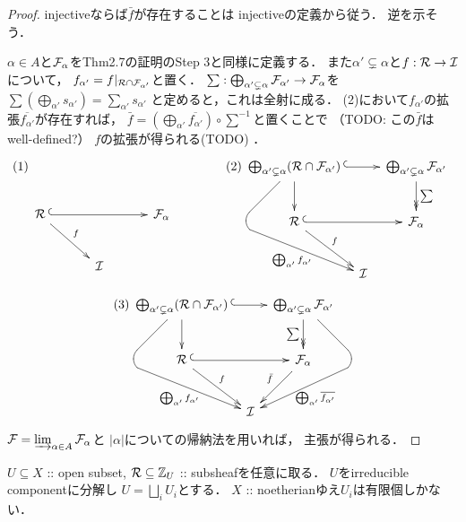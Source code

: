 \documentclass[a4paper]{jsarticle}
\begin{document}
    \begin{proof}
        injectiveならば$\bar{f}$が存在することは
        injectiveの定義から従う．
        逆を示そう．

        $\alpha \in A$と$\mathcal{F}_{\alpha}$をThm2.7の証明のStep 3と同様に定義する．
        また$\alpha' \subsetneq \alpha$と$f: \mathcal{R} \to \mathcal{I}$について，
        $f_{\alpha'}=f|_{\mathcal{R} \cap \mathcal{F}_{\alpha'}}$と置く．
        $\sum:  \bigoplus_{\alpha' \subsetneq \alpha} \mathcal{F}_{\alpha'} \to \mathcal{F}_{\alpha}$を
        $\sum \left(\bigoplus_{\alpha'} s_{\alpha'}\right)=\sum_{\alpha'} s_{\alpha'}$
        と定めると，これは全射に成る．
        (2)において$f_{\alpha'}$の拡張$\overline{f_{\alpha'}}$が存在すれば，
        $\bar{f}=(\bigoplus_{\alpha'} \overline{f_{\alpha'}}) \circ \sum^{-1}$と置くことで
        （TODO: この$\bar{f}$はwell-defined?）
        $f$の拡張が得られる(TODO) ．
        \[
        (1)
        \xymatrix@C=30pt@M=5pt
        {
            {}& {} & {} \\
            \shR \ar@{^{(}->}[rr] \ar[rd]^-{f}& {} & \shF_{\alpha}\\
            {} & \shI & {}
        }
        \qquad
        \qquad
        (2)
        \xymatrix@C=5pt@M=5pt
        {
            \bigoplus_{\alpha' \subsetneq \alpha} (\shR \cap \shF_{\alpha'})
            \ar@{^{(}->}[rr]\ar[d] \ar`ld[dd][rdd]_-{\bigoplus_{\alpha'} f_{\alpha'}}&
                {} &
                \bigoplus_{\alpha' \subsetneq \alpha} \shF_{\alpha'} \ar@{->>}[d]^-{\sum}\\
            \shR \ar@{^{(}->}[rr] \ar[rd]^-{f}& {} & \shF_{\alpha}\\
            {} & \shI & {}
        }
        \]
        \[
        (3)
        \xymatrix@C=5pt@M=5pt
        {
            \bigoplus_{\alpha' \subsetneq \alpha} (\shR \cap \shF_{\alpha'})
                    \ar@{^{(}->}[rr]\ar[d] \ar`ld[dd][rdd]_-{\bigoplus_{\alpha'} f_{\alpha'}}&
                {} &
                \bigoplus_{\alpha' \subsetneq \alpha} \shF_{\alpha'}
                    \ar@{->>}[d]_-{\sum}\ar`rd[dd][ldd]^-{\bigoplus_{\alpha'} \overline{f_{\alpha'}}}\\
                    \shR \ar@{^{(}->}[rr] \ar[rd]^-{f}& {} & \shF_{\alpha} \ar[ld]_-{\bar{f}}\\
            {} & \shI & {}
        }
        \]
        $\mathcal{F}=\varinjlim_{\alpha \in A} \mathcal{F}_{\alpha}$と
        $|\alpha|$についての帰納法を用いれば，
        主張が得られる．
    \end{proof}

    $U \subseteq X$ :: open subset, 
    $\mathcal{R} \subseteq \mathbb{Z}_{U}$ :: subsheafを任意に取る．
    $U$をirreducible componentに分解し
    $U=\bigsqcup_i U_i$とする．
    $X$ :: noetherianゆえ$U_i$は有限個しかない．
\end{document}
